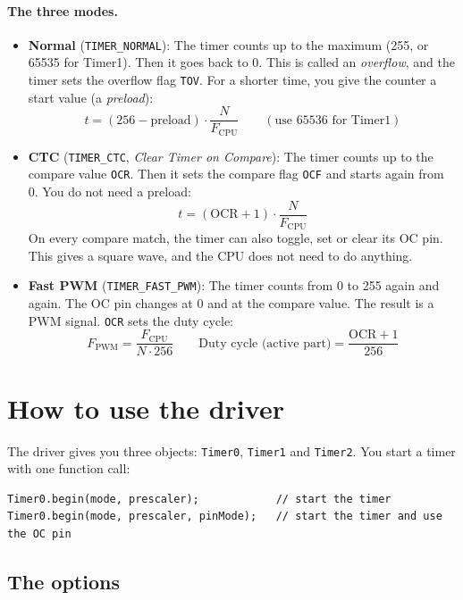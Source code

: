 \documentclass[11pt,a4paper]{article}
\newcommand{\code}[1]{\texttt{#1}}
\begin{document}
\paragraph{The three modes.}
\begin{itemize}
  \item \textbf{Normal} (\code{TIMER\_NORMAL}): The timer counts up to the
        maximum (255, or 65535 for Timer1). Then it goes back to 0. This is
        called an \emph{overflow}, and the timer sets the overflow flag
        \code{TOV}. For a shorter time, you give the counter a start value
        (a \emph{preload}):
        \[ t = (256 - \text{preload}) \cdot \frac{N}{F_{\text{CPU}}} \qquad (\text{use } 65536 \text{ for Timer1}) \]
  \item \textbf{CTC} (\code{TIMER\_CTC}, \emph{Clear Timer on Compare}):
        The timer counts up to the compare value \code{OCR}. Then it sets the
        compare flag \code{OCF} and starts again from 0. You do not need a
        preload:
        \[ t = (\text{OCR} + 1) \cdot \frac{N}{F_{\text{CPU}}} \]
        On every compare match, the timer can also toggle, set or clear its
        OC pin. This gives a square wave, and the CPU does not need to do anything.
  \item \textbf{Fast PWM} (\code{TIMER\_FAST\_PWM}): The timer counts from 0 to
        255 again and again. The OC pin changes at 0 and at the compare value.
        The result is a PWM signal. \code{OCR} sets the duty cycle:
        \[ F_{\text{PWM}} = \frac{F_{\text{CPU}}}{N \cdot 256} \qquad
           \text{Duty cycle (active part)} = \frac{\text{OCR} + 1}{256} \]
\end{itemize}

\section{How to use the driver}

The driver gives you three objects: \code{Timer0}, \code{Timer1} and
\code{Timer2}. You start a timer with one function call:

\begin{lstlisting}
Timer0.begin(mode, prescaler);            // start the timer
Timer0.begin(mode, prescaler, pinMode);   // start the timer and use the OC pin
\end{lstlisting}

\subsection*{The options}
\end{document}
